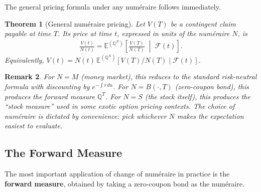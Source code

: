 \documentclass{report}
\theoremstyle{spacedplain}
\newtheorem{theorem}{Theorem}[section]
\theoremstyle{spaceddefinition}
\theoremstyle{spacedremark}
\newtheorem{remark}[theorem]{Remark}
\begin{document}
The general pricing formula under any num\'eraire follows immediately.

\begin{theorem}[General num\'eraire pricing]
Let $V(T)$ be a contingent claim payable at time $T$. Its price at time $t$, expressed in units of the num\'eraire $N$, is
\begin{align}
    \frac{V(t)}{N(t)} = \mathbb{E}^{(\mathbb{Q}^N)}\!\left[\frac{V(T)}{N(T)}\;\middle|\;\mathcal{F}(t)\right].
\end{align}
Equivalently, $V(t) = N(t)\,\mathbb{E}^{(\mathbb{Q}^N)}[V(T)/N(T) \mid \mathcal{F}(t)]$.
\end{theorem}

\begin{remark}
For $N = M$ (money market), this reduces to the standard risk-neutral formula with discounting by $e^{-\int r\,du}$. For $N = B(\cdot, T)$ (zero-coupon bond), this produces the forward measure $\mathbb{Q}^T$. For $N = S$ (the stock itself), this produces the ``stock measure'' used in some exotic option pricing contexts. The choice of num\'eraire is dictated by convenience: pick whichever $N$ makes the expectation easiest to evaluate.
\end{remark}


\subsection{The Forward Measure}

The most important application of change of num\'eraire in practice is the \textbf{forward measure}, obtained by taking a zero-coupon bond as the num\'eraire.
\end{document}
